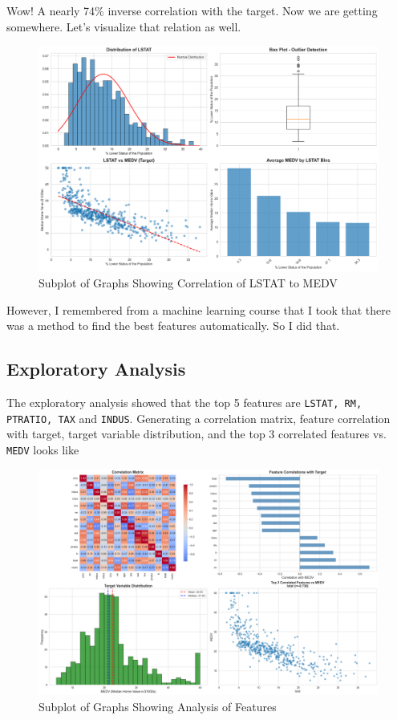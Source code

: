 \documentclass[12pt]{article}
\begin{document}
Wow! A nearly 74\% inverse correlation with the target. Now we are getting somewhere. Let's visualize that relation as well.

\begin{figure}[H]
    \centering
    \includegraphics[width=0.85\linewidth]{images/lstat_analysis.png}
    \caption{Subplot of Graphs Showing Correlation of LSTAT to MEDV}
    \label{fig:lstat_analysis}
\end{figure}

However, I remembered from a machine learning course that I took that there was a method to find the best features automatically. So I did that.

\subsection{Exploratory Analysis}

The exploratory analysis showed that the top 5 features are \lstinline{LSTAT, RM, PTRATIO, TAX} and \lstinline{INDUS}. 
Generating a correlation matrix, feature correlation with target, target variable distribution, and the top 3 correlated features vs. \lstinline{MEDV} looks like

\begin{figure}[H]
    \centering
    \includegraphics[width=0.85\linewidth]{images/01_exploratory_analysis.png}
    \caption{Subplot of Graphs Showing Analysis of Features}
    \label{fig:exploratoryanalysis}
\end{figure}
\end{document}
